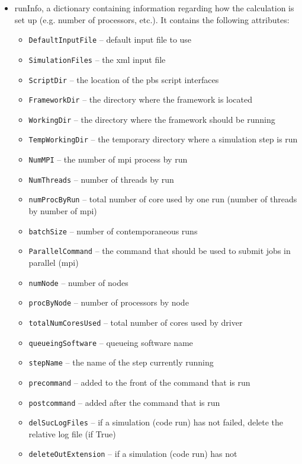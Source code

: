 \begin{itemize}
  \item runInfo, a dictionary containing information regarding how the
  calculation is set up (e.g. number of processors, etc.).
  It contains the following attributes:
  \begin{itemize}
    \item \texttt{DefaultInputFile} -- default input file to use
    \item \texttt{SimulationFiles} -- the xml input file
    \item \texttt{ScriptDir} -- the location of the pbs script interfaces
    \item \texttt{FrameworkDir} -- the directory where the framework is located
    \item \texttt{WorkingDir} -- the directory where the framework should be
    running
    \item \texttt{TempWorkingDir} -- the temporary directory where a simulation
    step is run
    \item \texttt{NumMPI} -- the number of mpi process by run
    \item \texttt{NumThreads} -- number of threads by run
    \item \texttt{numProcByRun} -- total number of core used by one run (number
    of threads by number of mpi)
    \item \texttt{batchSize} -- number of contemporaneous runs
    \item \texttt{ParallelCommand} -- the command that should be used to submit
    jobs in parallel (mpi)
    \item \texttt{numNode} -- number of nodes
    \item \texttt{procByNode} -- number of processors by node
    \item \texttt{totalNumCoresUsed} -- total number of cores used by driver
    \item \texttt{queueingSoftware} -- queueing software name
    \item \texttt{stepName} -- the name of the step currently running
    \item \texttt{precommand} -- added to the front of the command that is run
    \item \texttt{postcommand} -- added after the command that is run
    \item \texttt{delSucLogFiles} -- if a simulation (code run) has not failed,
    delete the relative log file (if True)
    \item \texttt{deleteOutExtension} -- if a simulation (code run) has not

\end{itemize}
\end{itemize}
